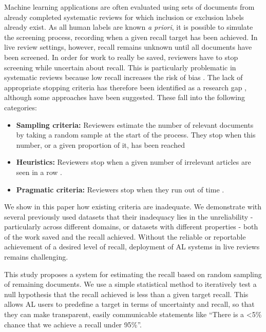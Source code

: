 \documentclass{bmcart}
\begin{document}
	Machine learning applications are often evaluated using sets of documents from already completed systematic reviews for which inclusion or exclusion labels already exist. 
	As all human labels are known \textit{a priori}, it is possible to simulate the screening process, recording when a given recall target has been achieved.
	In live review settings, however, recall remains unknown until all documents have been screened. 
	In order for work to really be saved, reviewers have to stop screening while uncertain about recall. 
	This is particularly problematic in systematic reviews because low recall increases the risk of bias \cite{Lefebvre2011}.
	The lack of appropriate stopping criteria has therefore been identified as a research gap \cite{bannach-brown2019}, although some approaches have been suggested. These fall into the following categories:
	\begin{itemize}
		\item \textbf{Sampling criteria:} Reviewers estimate the number of relevant documents by taking a random sample at the start of the process. They stop when this number, or a given proportion of it, has been reached \cite{Shemilt2014}
		\item \textbf{Heuristics:} Reviewers stop when a given number of irrelevant articles are seen in a row \cite{Jonnalagadda2013, Przybya2018}. 
		\item \textbf{Pragmatic criteria:} Reviewers stop when they run out of time \cite{miwa2014}. 
	\end{itemize}
	
	We show in this paper how existing criteria are inadequate.
	We demonstrate with several previously used datasets that their inadequacy lies in the unreliability - particularly across different domains, or datasets with different properties \cite{OMara-Eves2015} - both of the work saved and the recall achieved.  
	Without the reliable or reportable achievement of a desired level of recall, deployment of AL systems in live reviews remains challenging.
	
	This study proposes a system for estimating the recall based on random sampling of remaining documents. 
	We use a simple statistical method to iteratively test a null hypothesis that the recall achieved is less than a given target recall.
	This allows AL users to predefine a target in terms of uncertainty and recall, so that they can make transparent, easily communicable statements like ``There is a <5\% chance that we achieve a recall under 95\%''.
	
\end{document}
